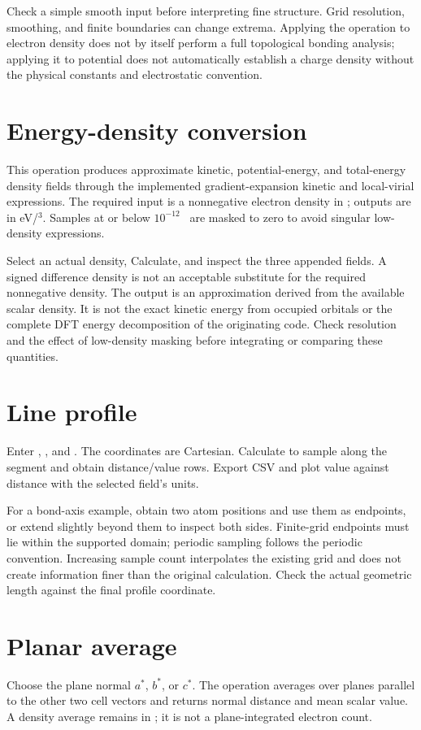 Check a simple smooth input before interpreting fine structure. Grid resolution, smoothing, and finite boundaries can change extrema. Applying the operation to electron density does not by itself perform a full topological bonding analysis; applying it to potential does not automatically establish a charge density without the physical constants and electrostatic convention.

\section{Energy-density conversion}
This operation produces approximate kinetic, potential-energy, and total-energy density fields through the implemented gradient-expansion kinetic and local-virial expressions. The required input is a nonnegative electron density in \densityunit; outputs are in eV/\angstrom$^3$. Samples at or below $10^{-12}$ \densityunit\ are masked to zero to avoid singular low-density expressions.

Select an actual density, Calculate, and inspect the three appended fields. A signed difference density is not an acceptable substitute for the required nonnegative density. The output is an approximation derived from the available scalar density. It is not the exact kinetic energy from occupied orbitals or the complete DFT energy decomposition of the originating code. Check resolution and the effect of low-density masking before integrating or comparing these quantities.

\section{Line profile}
Enter , , and . The coordinates are Cartesian. Calculate to sample along the segment and obtain distance/value rows. Export CSV and plot value against distance with the selected field's units.

For a bond-axis example, obtain two atom positions and use them as endpoints, or extend slightly beyond them to inspect both sides. Finite-grid endpoints must lie within the supported domain; periodic sampling follows the periodic convention. Increasing sample count interpolates the existing grid and does not create information finer than the original calculation. Check the actual geometric length against the final profile coordinate.

\section{Planar average}
Choose the plane normal $a^*$, $b^*$, or $c^*$. The operation averages over planes parallel to the other two cell vectors and returns normal distance and mean scalar value. A density average remains in \densityunit; it is not a plane-integrated electron count.

